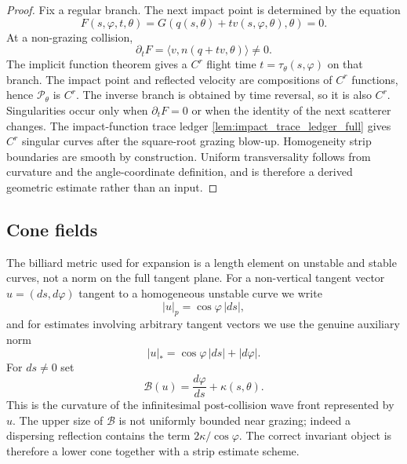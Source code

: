 \documentclass[12pt, letterpaper]{amsart}
\newcommand{\Pcal}{\mathcal{P}}
\theoremstyle{plain}
\theoremstyle{definition}
\theoremstyle{remark}
\begin{document}
\begin{proof}
Fix a regular branch.  The next impact point is determined by the equation
\begin{equation}
    F(s,\varphi,t,\theta)=G(q(s,\theta)+t v(s,\varphi,\theta),\theta)=0.
\end{equation}
At a non-grazing collision,
\begin{equation}
    \partial_tF=\langle v,n(q+t v,\theta)\rangle\ne0.
\end{equation}
The implicit function theorem gives a $C^r$ flight time $t=\tau_\theta(s,\varphi)$ on that branch.  The impact point and reflected velocity are compositions of $C^r$ functions, hence $\Pcal_\theta$ is $C^r$.  The inverse branch is obtained by time reversal, so it is also $C^r$.  Singularities occur only when $\partial_tF=0$ or when the identity of the next scatterer changes.  The impact-function trace ledger \cref{lem:impact_trace_ledger_full} gives $C^r$ singular curves after the square-root grazing blow-up.  Homogeneity strip boundaries are smooth by construction.  Uniform transversality follows from curvature and the angle-coordinate definition, and is therefore a derived geometric estimate rather than an input.
\end{proof}


\subsection{Cone fields}

The billiard metric used for expansion is a length element on unstable and
stable curves, not a norm on the full tangent plane.  For a non-vertical tangent
vector $u=(ds,d\varphi)$ tangent to a homogeneous unstable curve we write
\begin{equation}
\label{eq:p_length_element}
    |u|_p=\cos\varphi\,|ds|,
\end{equation}
and for estimates involving arbitrary tangent vectors we use the genuine
auxiliary norm
\begin{equation}
\label{eq:true_tangent_norm}
    |u|_*=\cos\varphi\,|ds|+|d\varphi| .
\end{equation}
For $ds\ne0$ set
\begin{equation}
\label{eq:wavefront_curvature_variable}
    \mathcal B(u)=\frac{d\varphi}{ds}+\kappa(s,\theta).
\end{equation}
This is the curvature of the infinitesimal post-collision wave front represented
by $u$.  The upper size of $\mathcal B$ is not uniformly bounded near grazing;
indeed a dispersing reflection contains the term $2\kappa/\cos\varphi$.  The
correct invariant object is therefore a lower cone together with a strip estimate scheme.
\end{document}
